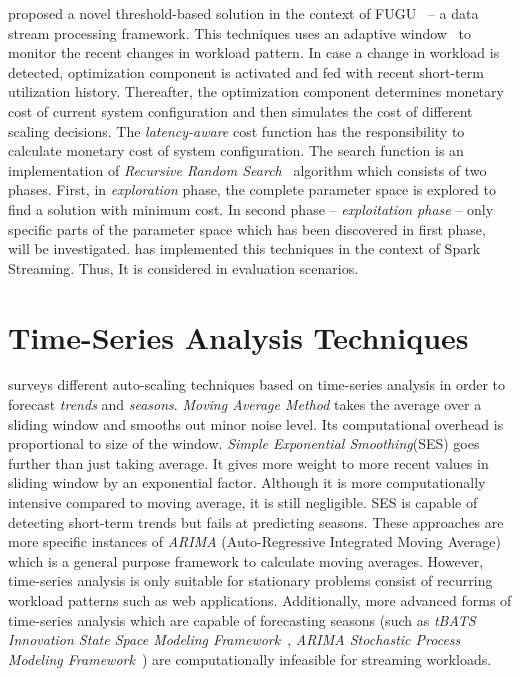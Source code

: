 \textcite{Heinze:2015} proposed a novel threshold-based solution in the context of FUGU~\cite{Grandl:2014:MPC} -- a data stream processing framework. This techniques uses an adaptive window~\cite{Bifet:2007} to monitor the recent changes in workload pattern. In case a change in workload is detected, optimization component is activated and fed with recent short-term utilization history. Thereafter, the optimization component determines monetary cost of current system configuration and then simulates the cost of different scaling decisions. The \emph{latency-aware} cost function has the responsibility to calculate monetary cost of system configuration. The search function is an implementation of \emph{Recursive Random Search}~\cite{Ye:2003:RRS} algorithm which consists of two phases. First, in \emph{exploration} phase, the complete parameter space is explored to find a solution with minimum cost. In second phase -- \emph{exploitation phase} -- only specific parts of the parameter space which has been discovered in first phase, will be investigated. \textcite{Michal:2017} has implemented this techniques in the context of Spark Streaming. Thus, It is considered in evaluation scenarios.

\section{Time-Series Analysis Techniques}
\label{related:tsa}

\textcite{Herbst:2013} surveys different auto-scaling techniques based on time-series analysis in order to forecast \emph{trends} and \emph{seasons}. \emph{Moving Average Method} takes the average over a sliding window and smooths out minor noise level. Its computational overhead is proportional to size of the window. \emph{Simple Exponential Smoothing}(SES) goes further than just taking average. It gives more weight to more recent values in sliding window by an exponential factor. Although it is more computationally intensive compared to moving average, it is still negligible. SES is capable of detecting short-term trends but fails at predicting seasons. These approaches are more specific instances of \emph{ARIMA} (Auto-Regressive Integrated Moving Average) which is a general purpose framework to calculate moving averages. However, time-series analysis is only suitable for stationary problems consist of recurring workload patterns such as web applications. Additionally, more advanced forms of time-series analysis which are capable of forecasting seasons (such as \emph{tBATS Innovation State Space Modeling Framework}~\cite{Alysha2011}, \emph{ARIMA Stochastic Process Modeling Framework}~\cite{JSSv027i03}) are computationally infeasible for streaming workloads.

